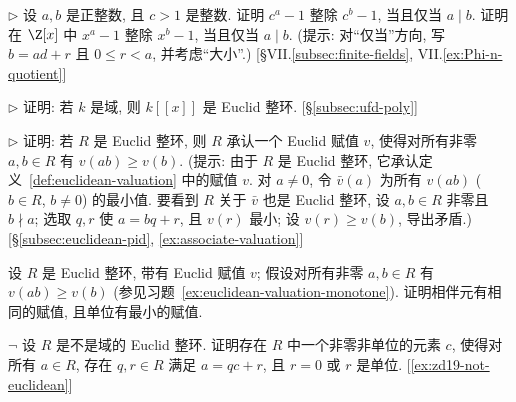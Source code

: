 \begin{prob}
\label{ex:ca-1-divides}
$\triangleright$ 设 $a,b$ 是正整数, 且 $c>1$ 是整数. 证明 $c^a-1$ 整除 $c^b-1$, 当且仅当 $a\mid b$. 证明在 $\Z[x]$ 中 $x^a-1$ 整除 $x^b-1$, 当且仅当 $a\mid b$. (提示: 对``仅当''方向, 写 $b=ad+r$ 且 $0\le r<a$, 并考虑``大小''.) [§VII.\ref{subsec:finite-fields}, VII.\ref{ex:Phi-n-quotient}]
\end{prob}

\begin{prob}
\label{ex:kxx-euclidean}
$\triangleright$ 证明: 若 $k$ 是域, 则 $k[[x]]$ 是 Euclid 整环. [§\ref{subsec:ufd-poly}]
\end{prob}

\begin{prob}
\label{ex:euclidean-valuation-monotone}
$\triangleright$ 证明: 若 $R$ 是 Euclid 整环, 则 $R$ 承认一个 Euclid 赋值 $v$, 使得对所有非零 $a,b\in R$ 有 $v(ab)\ge v(b)$. (提示: 由于 $R$ 是 Euclid 整环, 它承认定义~\ref{def:euclidean-valuation} 中的赋值 $v$. 对 $a\neq 0$, 令 $\bar v(a)$ 为所有 $v(ab)$ ($b\in R$, $b\neq 0$) 的最小值. 要看到 $R$ 关于 $\bar v$ 也是 Euclid 整环, 设 $a,b\in R$ 非零且 $b\nmid a$; 选取 $q,r$ 使 $a=bq+r$, 且 $v(r)$ 最小; 设 $v(r)\ge v(b)$, 导出矛盾.) [§\ref{subsec:euclidean-pid}, \ref{ex:associate-valuation}]
\end{prob}

\begin{prob}
\label{ex:associate-valuation}
设 $R$ 是 Euclid 整环, 带有 Euclid 赋值 $v$; 假设对所有非零 $a,b\in R$ 有 $v(ab)\ge v(b)$ (参见习题~\ref{ex:euclidean-valuation-monotone}). 证明相伴元有相同的赋值, 且单位有最小的赋值.
\end{prob}

\begin{prob}
\label{ex:euclidean-nonfield-quasi}
$\neg$ 设 $R$ 是不是域的 Euclid 整环. 证明存在 $R$ 中一个非零非单位的元素 $c$, 使得对所有 $a\in R$, 存在 $q,r\in R$ 满足 $a=qc+r$, 且 $r=0$ 或 $r$ 是单位. [\ref{ex:zd19-not-euclidean}]
\end{prob}

